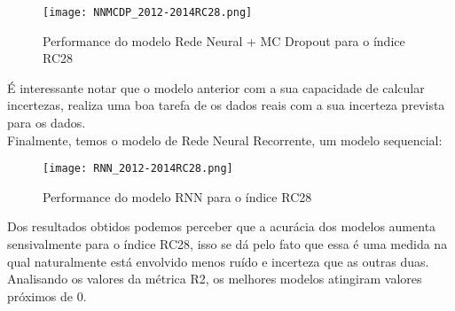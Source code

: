 \begin{figure}[H]
\centering
\texttt{[image: NNMCDP\_2012-2014RC28.png]}
\caption{Performance do modelo Rede Neural + MC Dropout para o índice RC28}
\label{fig:nnmc2}
\end{figure}


É interessante notar que o modelo anterior com a sua capacidade de calcular incertezas, realiza uma boa tarefa de  os dados reais com a sua incerteza prevista para os dados. \\ 

Finalmente, temos o modelo de Rede Neural Recorrente, um modelo sequencial:

\begin{figure}[H]
\centering
\texttt{[image: RNN\_2012-2014RC28.png]}
\caption{Performance do modelo RNN para o índice RC28}
\end{figure}


Dos resultados obtidos podemos perceber que a acurácia dos modelos aumenta sensivalmente para o índice RC28, isso se dá pelo fato que essa é uma medida na qual naturalmente está envolvido menos ruído e incerteza que as outras duas. Analisando os valores da métrica R2, os melhores modelos atingiram valores próximos de $0$.


